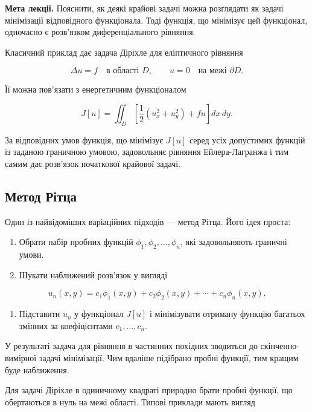 \documentclass[
  ukrainian,
]{article}
\providecommand{\tightlist}{%
  \setlength{\itemsep}{0pt}\setlength{\parskip}{0pt}}
\begin{document}
\textbf{Мета лекції.} Пояснити, як деякі крайові задачі можна розглядати
як задачі мінімізації відповідного функціонала. Тоді функція, що
мінімізує цей функціонал, одночасно є розв'язком диференціального
рівняння.

Класичний приклад дає задача Діріхле для еліптичного рівняння

\[
\Delta u = f \quad \text{в області } D, \qquad u = 0 \quad \text{на межі } \partial D.
\]

Її можна пов'язати з енергетичним функціоналом

\[
J[u] = \iint_D \left[ \frac{1}{2}\left(u_x^2 + u_y^2\right) + fu \right] dx\,dy.
\]

За відповідних умов функція, що мінімізує \(J[u]\) серед усіх допустимих
функцій із заданою граничною умовою, задовольняє рівняння
Ейлера-Лагранжа і тим самим дає розв'язок початкової крайової задачі.

\subsection{Метод
Рітца}\label{ux43cux435ux442ux43eux434-ux440ux456ux442ux446ux430}

Один із найвідоміших варіаційних підходів --- метод Рітца. Його ідея
проста:

\begin{enumerate}
\def\labelenumi{\arabic{enumi}.}
\tightlist
\item
  Обрати набір пробних функцій \(\phi_1, \phi_2, \ldots, \phi_n\), які
  задовольняють граничні умови.
\item
  Шукати наближений розв'язок у вигляді
\end{enumerate}

\[
u_n(x,y) = c_1\phi_1(x,y) + c_2\phi_2(x,y) + \cdots + c_n\phi_n(x,y).
\]

\begin{enumerate}
\def\labelenumi{\arabic{enumi}.}
\setcounter{enumi}{2}
\tightlist
\item
  Підставити \(u_n\) у функціонал \(J[u]\) і мінімізувати отриману
  функцію багатьох змінних за коефіцієнтами \(c_1,\ldots,c_n\).
\end{enumerate}

У результаті задача для рівняння в частинних похідних зводиться до
скінченно-вимірної задачі мінімізації. Чим вдаліше підібрано пробні
функції, тим кращим буде наближення.

Для задачі Діріхле в одиничному квадраті природно брати пробні функції,
що обертаються в нуль на межі області. Типові приклади мають вигляд
\end{document}
